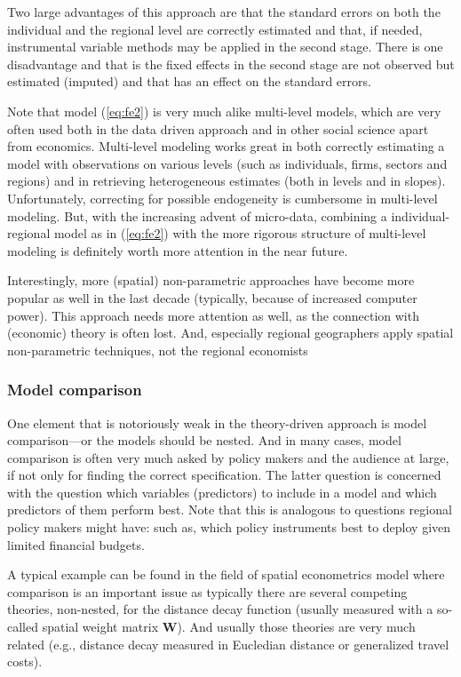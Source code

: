 \documentclass[fleqn,10pt]{SelfArx} %
\begin{document}
Two large advantages of this approach are that the standard errors on both the
individual and the regional level are correctly estimated and that, if needed,
instrumental variable methods may be applied in the second stage. There is one
disadvantage and that is the fixed effects in the second stage are not observed
but estimated (imputed) and that has an effect on the standard errors.

Note that model (\ref{eq:fe2}) is very much alike multi-level models, which are
very often used both in the data driven approach and in other social science
apart from economics. Multi-level modeling works great in both correctly
estimating a model with observations on various levels (such as individuals, firms,
sectors and regions) and in retrieving heterogeneous estimates (both in levels
and in slopes). Unfortunately, correcting for possible endogeneity is cumbersome
in multi-level modeling. But, with the increasing advent of micro-data,
combining a individual-regional model as in (\ref{eq:fe2}) with the more
rigorous structure of multi-level modeling is definitely worth more attention in
the near future. 

Interestingly, more (spatial) non-parametric approaches \citep[see, e.g., the
geograpically weighted regression exercise in][]{Thissen2016} have become more
popular as well in the last decade (typically, because of increased computer
power). This approach needs more attention as well, as the connection with
(economic) theory is often lost. And, especially regional geographers apply
spatial non-parametric techniques, not the regional economists 

\subsubsection{Model comparison}

One element that is notoriously weak in the theory-driven approach is model
comparison---or the models should be nested. And in many cases, model comparison
is often very much asked by policy makers and the audience at large, if not only
for finding the correct specification. The latter question is concerned with the
question which variables (predictors) to include in a model and which predictors
of them perform best. Note that this is analogous to questions regional policy makers
might have: such as, which policy instruments best to deploy given limited
financial budgets.

A typical example can be found in the field of spatial econometrics model where comparison is an important
issue as typically there are several competing theories, non-nested, for the
distance decay function (usually measured with a so-called spatial weight matrix
$\mathbf{W}$). And usually those theories are very much related (e.g., distance
decay measured in Eucledian distance or generalized travel costs).
\end{document}
